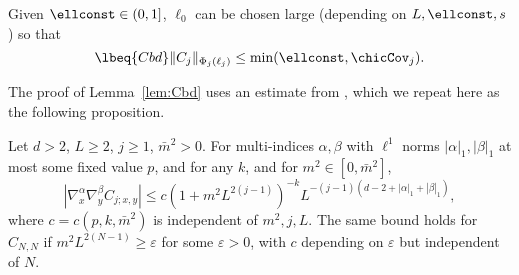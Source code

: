 \begin{lemma}
\label{lem:Cbd}
Given $\ellconst \in (0, 1]$, $\ell_0$ can be chosen large (depending on $L,\ellconst,s$)
so that
\begin{equation}
\lbeq{Cbd}
\|C_j\|_{\Phi_{j}(\ell_j)} \leq \min(\ellconst, \chicCov_j).
\end{equation}
\end{lemma}



The proof of Lemma~\ref{lem:Cbd} uses an estimate from
\cite[Proposition~\ref{pt-prop:Cdecomp}]{BBS-rg-pt}, which we repeat here as
the following proposition.

\begin{prop}
\label{prop:Cdecomp}
  Let $d >2$, $L\geq 2$, $j \ge 1$, $\bar m^2 >0$.
  For multi-indices $\alpha,\beta$ with
  $\ell^1$ norms $|\alpha|_1,|\beta|_1$ at most
  some fixed value $p$,
  and for any $k$, and for $m^2 \in [0,\bar m^2]$,
  \begin{equation}
    \label{e:scaling-estimate}
    |\nabla_x^\alpha \nabla_y^\beta C_{j;x,y}|
    \leq c(1+m^2L^{2(j-1)})^{-k}
    L^{-(j-1)(d-2 +|\alpha|_1+|\beta|_1)},
  \end{equation}
  where $c=c(p,k,\bar m^2)$ is independent of $m^2,j,L$.
  The same bound holds for $C_{N,N}$ if
  $m^2L^{2(N-1)} \ge \varepsilon$ for some $\varepsilon >0$,
  with $c$ depending on $\varepsilon$ but independent of $N$.
\end{prop}

